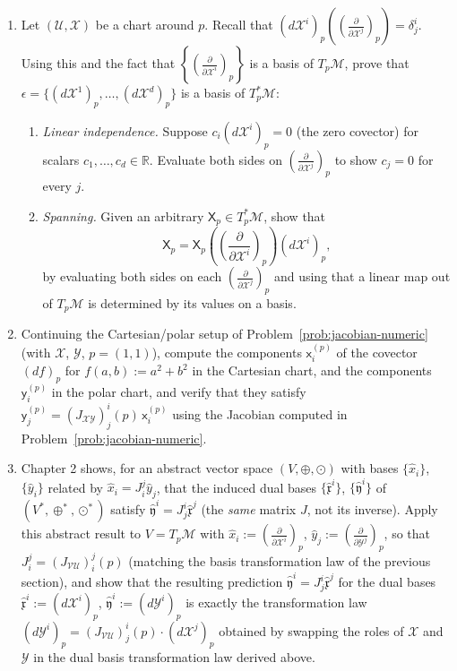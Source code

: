 \documentclass[11pt]{article}
\begin{document}
\begin{enumerate}[label=\textbf{4.\arabic*}, leftmargin=2.2cm, start=14]

\item \label{prob:cotangent-basis-is-basis}
Let $(\mathcal U,\mathcal X)$ be a chart around $p$. Recall that
$(d\mathcal X^i)_p\left(\left(\frac{\partial}{\partial\mathcal
X^j}\right)_p\right)=\delta^i_j$. Using this and the fact that
$\left\{\left(\frac{\partial}{\partial\mathcal X^i}\right)_p\right\}$ is a
basis of $T_p\mathcal M$, prove that $\epsilon=\{(d\mathcal
X^1)_p,\dots,(d\mathcal X^d)_p\}$ is a basis of $T_p^*\mathcal M$:
\begin{enumerate}[label=(\alph*)]
  \item \emph{Linear independence.} Suppose $c_i(d\mathcal
  X^i)_p=0$ (the zero covector) for scalars $c_1,\dots,c_d\in\mathbb R$.
  Evaluate both sides on $\left(\frac{\partial}{\partial\mathcal
  X^j}\right)_p$ to show $c_j=0$ for every $j$.
  \item \emph{Spanning.} Given an arbitrary $\mathsf X_p\in T_p^*\mathcal
  M$, show that
  \[
  \mathsf X_p = \mathsf X_p\!\left(\left(\frac{\partial}{\partial\mathcal X^i}\right)_p\right)(d\mathcal X^i)_p,
  \]
  by evaluating both sides on each
  $\left(\frac{\partial}{\partial\mathcal X^j}\right)_p$ and using that a
  linear map out of $T_p\mathcal M$ is determined by its values on a basis.
\end{enumerate}

\item \label{prob:covector-components-numeric}
Continuing the Cartesian/polar setup of Problem~\ref{prob:jacobian-numeric}
(with $\mathcal X$, $\mathcal Y$, $p=(1,1)$), compute the components
$\mathsf x_i^{(p)}$ of the covector $(df)_p$ for $f(a,b):=a^2+b^2$ in the
Cartesian chart, and the components $\mathsf y_i^{(p)}$ in the polar chart,
and verify that they satisfy $\mathsf y_j^{(p)}=
(J_{\mathcal{XY}})^i_j(p)\,\mathsf x_i^{(p)}$ using the Jacobian computed in
Problem~\ref{prob:jacobian-numeric}.

\item \label{prob:dual-transformation-synthesis}
Chapter 2 shows, for an abstract vector space $(V,\oplus,\odot)$ with bases
$\{\hat x_i\}$, $\{\hat y_i\}$ related by $\hat x_i= J_i^j\hat y_j$,
that the induced dual bases $\{\hat{\mathfrak x}^i\}$, $\{\hat{\mathfrak
y}^i\}$ of $(V^*,\oplus^*,\odot^*)$ satisfy $\hat{\mathfrak
y}^i= J^i_j\hat{\mathfrak x}^j$ (the \emph{same} matrix $J$, not its
inverse). Apply this abstract result to $V=T_p\mathcal M$ with $\hat
x_i:=\left(\frac{\partial}{\partial\mathcal X^i}\right)_p$, $\hat
y_j:=\left(\frac{\partial}{\partial\mathcal Y^j}\right)_p$, so that
$J^j_i=(J_{\mathcal{VU}})^j_i(p)$ (matching the basis transformation law of
the previous section), and show that the resulting prediction
$\hat{\mathfrak y}^i= J^i_j\hat{\mathfrak x}^j$ for the dual bases
$\hat{\mathfrak x}^i:=(d\mathcal X^i)_p$, $\hat{\mathfrak
y}^i:=(d\mathcal Y^i)_p$ is exactly the transformation law
$(d\mathcal Y^i)_p=(J_{\mathcal{VU}})^i_j(p)\cdot(d\mathcal X^j)_p$
obtained by swapping the roles of $\mathcal X$ and $\mathcal Y$ in the dual
basis transformation law derived above.

\end{enumerate}
\end{document}

